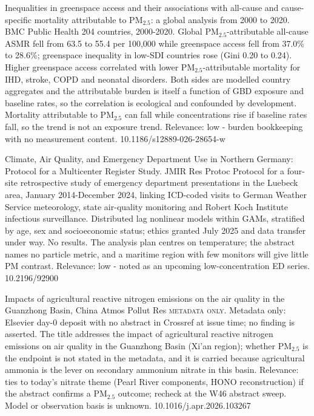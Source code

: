 \documentclass[10pt]{article}
\begin{document}
{Inequalities in greenspace access and their associations with all-cause and cause-specific mortality attributable to PM$_{2.5}$: a global analysis from 2000 to 2020.}
{BMC Public Health}
{204 countries, 2000-2020. Global PM$_{2.5}$-attributable all-cause ASMR fell from 63.5 to 55.4 per 100,000 while greenspace access fell from 37.0\% to 28.6\%; greenspace inequality in low-SDI countries rose (Gini 0.20 to 0.24). Higher greenspace access correlated with lower PM$_{2.5}$-attributable mortality for IHD, stroke, COPD and neonatal disorders. Both sides are modelled country aggregates and the attributable burden is itself a function of GBD exposure and baseline rates, so the correlation is ecological and confounded by development. Mortality attributable to PM$_{2.5}$ can fall while concentrations rise if baseline rates fall, so the trend is not an exposure trend. Relevance: low - burden bookkeeping with no measurement content.}
{10.1186/s12889-026-28654-w}

{Climate, Air Quality, and Emergency Department Use in Northern Germany: Protocol for a Multicenter Register Study.}
{JMIR Res Protoc}
{Protocol for a four-site retrospective study of emergency department presentations in the Luebeck area, January 2014-December 2024, linking ICD-coded visits to German Weather Service meteorology, state air-quality monitoring and Robert Koch Institute infectious surveillance. Distributed lag nonlinear models within GAMs, stratified by age, sex and socioeconomic status; ethics granted July 2025 and data transfer under way. No results. The analysis plan centres on temperature; the abstract names no particle metric, and a maritime region with few monitors will give little PM contrast. Relevance: low - noted as an upcoming low-concentration ED series.}
{10.2196/92900}

{Impacts of agricultural reactive nitrogen emissions on the air quality in the Guanzhong Basin, China}
{Atmos Pollut Res}
{\textsc{metadata only.} Metadata only: Elsevier day-0 deposit with no abstract in Crossref at issue time; no finding is asserted. The title addresses the impact of agricultural reactive nitrogen emissions on air quality in the Guanzhong Basin (Xi'an region); whether PM$_{2.5}$ is the endpoint is not stated in the metadata, and it is carried because agricultural ammonia is the lever on secondary ammonium nitrate in this basin. Relevance: ties to today's nitrate theme (Pearl River components, HONO reconstruction) if the abstract confirms a PM$_{2.5}$ outcome; recheck at the W46 abstract sweep. Model or observation basis is unknown.}
{10.1016/j.apr.2026.103267}
\end{document}

